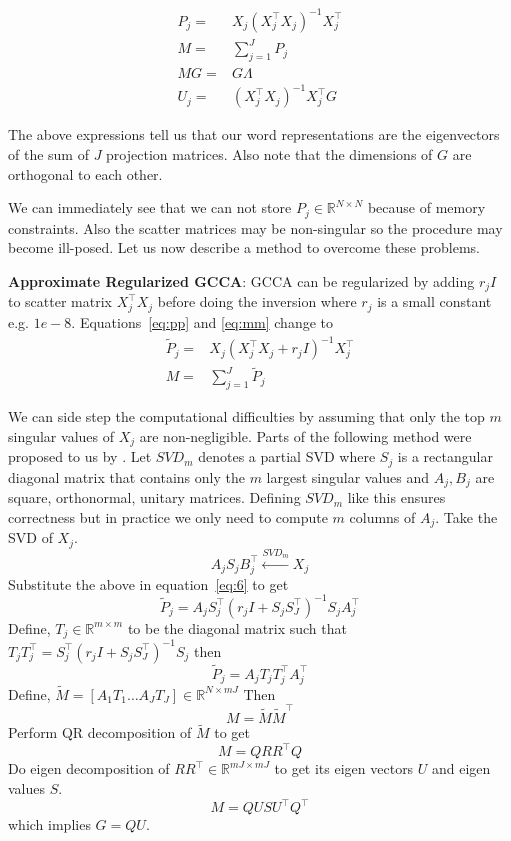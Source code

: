 \documentclass[11pt]{article}
\begin{document}
\begin{align}
P_j =& X_j(X_j^\top X_j)^{-1}X_j^\top \label{eq:pp}\\
M =& \sum_{j=1}^J P_j \label{eq:mm}\\
M G =& G \Lambda\\
U_j =& \left(X_j^\top X_j\right)^{-1} X_j^\top G
\end{align}

The above expressions tell us that our word representations are the
eigenvectors of the sum of $J$ projection matrices. Also note that the
dimensions of $G$ are orthogonal to each other. %

We can immediately see that we can not store
 $P_j \in \mathbb{R}^{N \times N}$ because of memory constraints.
Also the scatter matrices may be non-singular so the procedure may become
ill-posed. 
Let us now describe a method to overcome these problems.

\noindent\textbf{Approximate Regularized GCCA}: GCCA can be regularized by adding $r_jI$ to 
scatter matrix $X_j^\top X_j$ before doing the inversion where
$r_j$ is a small constant e.g. $1e-8$. Equations~\ref{eq:pp}
and \ref{eq:mm} change to
\begin{align}
  \widetilde{P}_{j} =& X_j(X_j^\top X_j+r_jI)^{-1}X_j^\top \label{eq:6}\\
  M =& \sum_{j=1}^J \widetilde{P}_{j} \label{eq:mmm}
\end{align}

We can side step the computational difficulties by assuming that only
the top $m$ singular values of $X_j$ are non-negligible. Parts of the
following method were proposed to us by \cite{savostyanov}.
Let $SVD_m$ denotes a partial SVD where $S_j$ is a rectangular diagonal
matrix that contains only the $m$ largest singular values and $A_j, B_j$
are square, orthonormal, unitary matrices. Defining $SVD_m$ like this
ensures correctness but in practice we only need to compute $m$
columns of $A_j$. Take the SVD of $X_j$.
$$A_{j} S_{j} B^\top_{j} \xleftarrow{SVD_{m}} X_j$$
 Substitute the above in equation~\ref{eq:6} to get 
$$\widetilde{P}_j = A_j S_j^\top(r_j I + S_j S_J^\top)^{-1}S_j A_j^\top$$ 
Define, $T_j \in \mathbb{R}^{m \times m}$ to be the diagonal matrix such that
$T_jT_j^\top = S_j^\top(r_j I + S_j S_J^\top)^{-1}S_j $ then
$$\widetilde{P}_j = A_j T_j T_j^\top A_j^\top$$
Define, $\tilde{M} = \left[ A_1T_1 \ldots A_JT_J \right] \in \mathbb{R}^{N
  \times mJ}$
Then 
$$M = \tilde{M} \tilde{M}^\top$$
Perform QR decomposition of $\tilde{M}$ to get
$$M = Q R R^\top Q$$
Do eigen decomposition of $R R^\top \in \mathbb{R}^{mJ \times mJ}$
to get its eigen vectors $U$ and eigen values $S$.
$$M = Q U S U^\top Q^\top$$
 which implies $G = QU$. 
\end{document}
